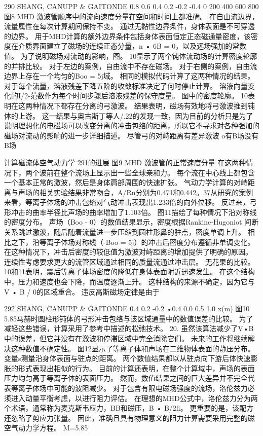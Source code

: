 \documentclass[UTF8,11pt,a4paper,openany,fontset=fandol]{ctexbook}
\begin{document}
290 SHANG, CANUPP \& GAITONDE 0.8 0.6 0.4 0.2 -0.2 -0.4 0 200 400 600 800 图8 MHD 激波管顺序中的流向速度分量在空间和时间上都准确。 在自由流边界，流量属性在每次计算期间保持不变。 通过无黏性边界条件，身体表面是不可穿透的边界。 用于MHD计算的额外边界条件包括身体表面恒定正态磁通量密度，该密度在介质界面建立了磁场的连续正态分量，n • 6B = 0，以及远场强加的常数值。 为了说明磁场对流动的影响，图。 10显示了两个钝体流动场的计算密度轮廓的并排比较。 对于左边的案例，自由流中不存在磁场。 对于右侧的案例，自由流边界上存在一个均匀的Boo = 5j域。 相同的模拟代码计算了这两种情况的结果。 对于每个流量，溶液残差下降五阶的收敛标准决定了何时停止计算。 溶液向量变化的I/2-范数作为每个时间步骤后溶液残差的保守度量。 图中的密度轮廓。 10表明在这两种情况下都存在分离的弓激波。 结果表明，磁场有效地将弓激波推到钝体的上游。 这一结果与奥古斯丁等人/.22的发现一致，因为目前的分析只是为了说明理想化的电磁场可以改变分离的冲击包络的距离，所以它不寻求对各种强加的磁场对流动的影响的进一步详细描述。 尽管弓的对峙距离有差异激波 o有B场没有B场

计算磁流体空气动力学 291的进展 图9 MHD 激波管的正常速度分量 在这两种情况下，两个波前在整个流场上显示出一些全球亲和力。 每个流在中心线上都包含一个基本正常的激波，然后是身体肩部周围的快速扩张。 气动力学计算的对峙距离与声场的相关实验结果非常吻合，A/Rn分别为0.471和0.442。37从研究的案例来看，等离子体场的冲击包络对气动冲击表现出1.233倍的向外位移。 反过来，弓形冲击的曲率半径比声场的曲率增加了1.103倍。 图11描绘了每种情况下沿对称线的密度分布。 声场（Boo - 0）的数值结果显示，密度根据Rankine-Hugoniot 间断关系跳过激波，随后随着流量进一步压缩到圆柱形鼻的驻点，密度单调上升。 相比之下，沿等离子体场对称线（-Boo = 5j）的冲击后密度分布遵循非单调变化。 在这种情况下，冲击后密度的较低值为激波对峙距离的增加提供了明确的原因。 连续性考虑要求更大的流管区域通过相同的质量流通过冲击层。 无花果的比较。 10和11表明，震后等离子体场密度的降低在身体表面附近迅速发生。 在这个结构中，压力和速度也会下降，而温度逐渐上升。 这种结构的来源不确定，因为它与V • B / 0的区域重合。 违反高斯磁场定律是由于

292 SHANG, CANUPP \& GAITONDE 0.4 0.2 -0.2 •0.4 0.0 0.5 1.0 x(m) 图10 5.85马赫时圆柱形钝体的弓形冲击包络与该区域通量中的数值误差的比较。 为了减轻这些错误，计算采用了参考中描述的松弛技术。 20. 虽然该算法减少了V•B中的误差，但它并没有在激波和停滞区域中完全消除它们。 未来的工作将继续解决这种数值不确定性。 图12显示了等离子体和声场在二维物体表面的静压分布。 变量s测量沿身体表面与驻点的距离。 两个数值结果都以从驻点向下游后体快速膨胀的形式表现出相似的行为。 目前的计算还表明，在整个计算域中，声场的表面压力均匀高于等离子体的表面压力。 然而，数值结果之间的巨大差异并不完全代表等离子体场中可能的波阻减少。 对于包含有限电磁场强度的流场，洛伦兹力必须进入动量平衡考虑，以进行阻力评估。 在理想的MHD公式中，洛伦兹力分为两个术语，通常称为麦克斯韦应力，BB和磁压，B • B/2fi。 更重要的是，该配方还忽略了剪应力张量。 因此，准确且具有物理意义的阻力计算需要采用完整的磁空气动力学方程。 M=5.85
\end{document}

